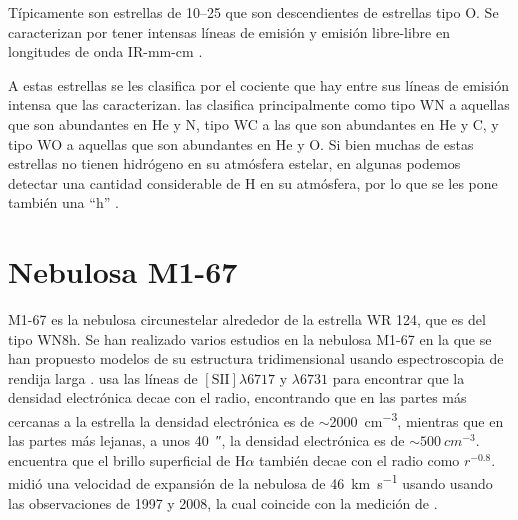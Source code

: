 \documentclass{book}
\begin{document}
Típicamente son estrellas de 10--\SI{25}{\msun} que son descendientes de estrellas tipo O. Se caracterizan por tener intensas líneas de emisión y emisión libre-libre en longitudes de onda IR-mm-cm \citep{crowther:2007}.

A estas estrellas se les clasifica por el cociente que hay entre sus líneas de emisión intensa que las caracterizan. \cite{VanDerHutch:2001} las clasifica principalmente como tipo WN a aquellas que son abundantes en He y N, tipo WC a las que son abundantes en He y C, y tipo WO a aquellas que son abundantes en He y O. Si bien muchas de estas estrellas no tienen hidrógeno en su atmósfera estelar, en algunas podemos detectar una cantidad considerable de H en su atmósfera, por lo que se les pone también una ``h'' \citep{SSM:1996}.



\section{Nebulosa M1-67}

M1-67 es la nebulosa circunestelar alrededor de la estrella WR 124, que es del tipo WN8h. 
Se han realizado varios estudios en la nebulosa M1-67 en la que se han propuesto modelos de su estructura tridimensional usando espectroscopia de rendija larga \citep{Zavala:2022}. \cite{Marcel:2021} usa las líneas de $[\mathrm{S \scriptstyle{II}}]\lambda6717$ y $\lambda6731$ para encontrar que la densidad electrónica decae con el radio, encontrando que en las partes más cercanas a la estrella la densidad electrónica es de $\sim$\SI{2000}{cm^{-3}}, mientras que en las partes más lejanas, a unos \SI{40}{\arcsecond}, la densidad electrónica es de $\sim\SI{500}{cm^{-3}}$. \cite{Grosdidier:1998} encuentra que el brillo superficial de H$\alpha$ también decae con el radio como $r^{-0.8}$. \cite{Mancherko:2010} midió una velocidad de expansión de la nebulosa de \SI{46}{km.s^{-1}} usando usando las observaciones de 1997 \citep{Grosdidier:1998} y 2008, la cual coincide con la medición de \cite{Zavala:2022}. 
\end{document}

